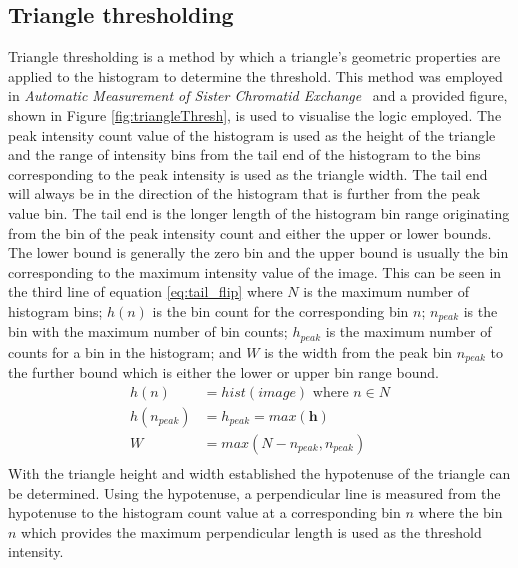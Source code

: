 \subsection{Triangle thresholding}
Triangle thresholding is a method by which a triangle's geometric properties are applied to the histogram to determine the threshold. This method was employed in \textit{Automatic Measurement of Sister Chromatid Exchange}~\cite{triangleThresh} and a provided figure, shown in Figure \ref{fig:triangleThresh}, is used to visualise the logic employed. The peak intensity count value of the histogram is used as the height of the triangle and the range of intensity bins from the tail end of the histogram to the bins corresponding to the peak intensity  is used as the triangle width. The tail end will always be in the direction of the histogram that is further from the peak value bin. The tail end is the longer length of the histogram bin range originating from the bin of the peak intensity count and either the upper or lower bounds. The lower bound is generally the zero bin and the upper bound is usually the bin corresponding to the maximum intensity value of the image. This can be seen in the third line of equation \ref{eq:tail_flip} where $N$ is the maximum number of histogram bins; $h(n)$ is the bin count for the corresponding bin $n$; $n_{peak}$ is the bin with the maximum number of bin counts; $h_{peak}$ is the maximum number of counts for a bin in the histogram; and $W$ is the width from the peak bin $n_{peak}$ to the further bound which is either the lower or upper bin range bound. 
\begin{equation}\label{eq:tail_flip}
\begin{split}
    h(n) &= hist(image) \text{ where } n \in N \\
    h(n_{peak}) &= h_{peak} = max(\mathbf{h})\\
    W &= max(N - n_{peak}, n_{peak}) \\
\end{split}
\end{equation}
With the triangle height and width established the hypotenuse of the triangle can be determined. Using the hypotenuse, a perpendicular line is measured from the hypotenuse to the histogram count value at a corresponding bin $n$ where the bin $n$ which provides the maximum perpendicular length is used as the threshold intensity.
